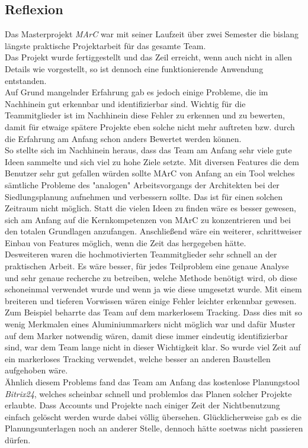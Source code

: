 \subsection{Reflexion}\label{sec:reflexion}
Das Masterprojekt \textit{MArC} war mit seiner Laufzeit über zwei Semester die bislang längste praktische Projektarbeit für das gesamte Team. \\
Das Projekt wurde fertiggestellt und das Zeil erreicht, wenn auch nicht in allen Details wie vorgestellt, so ist dennoch eine funktionierende Anwendung entstanden.\\
Auf Grund mangelnder Erfahrung gab es jedoch einige Probleme, die im Nachhinein gut erkennbar und identifizierbar sind. Wichtig für die Teammitglieder ist im Nachhinein diese Fehler zu erkennen und zu bewerten, damit für etwaige spätere Projekte eben solche nicht mehr auftreten bzw. durch die Erfahrung am Anfang schon anders Bewertet werden können.\\
So stellte sich im Nachhinein heraus, dass das Team am Anfang sehr viele gute Ideen sammelte und sich viel zu hohe Ziele setzte. Mit diversen Features die dem Benutzer sehr gut gefallen würden sollte MArC von Anfang an ein Tool welches sämtliche Probleme des "analogen" Arbeitsvorgangs der Architekten bei der Siedlungsplanung aufnehmen und verbessern sollte. Das ist für einen solchen Zeitraum nicht möglich. Statt die vielen Ideen zu finden wäre es besser gewesen, sich am Anfang auf die Kernkompetenzen von MArC zu konzentrieren und bei den totalen Grundlagen anzufangen. Anschließend wäre ein weiterer, schrittweiser Einbau von Features möglich, wenn die Zeit das hergegeben hätte.\\
Desweiteren waren die hochmotivierten Teammitglieder sehr schnell an der praktischen Arbeit. Es wäre besser, für jedes Teilproblem eine genaue Analyse und sehr genaue recherche zu betreiben, welche Methode benötigt wird, ob diese schoneinmal verwendet wurde und wenn ja wie diese umgesetzt wurde. Mit einem breiteren und tieferen Vorwissen wären einige Fehler leichter erkennbar gewesen. Zum Beispiel beharrte das Team auf dem markerlosem Tracking. Dass dies mit so wenig Merkmalen eines Aluminiummarkers nicht möglich war und dafür Muster auf dem Marker notwendig wären, damit diese immer eindeutig identifizierbar sind, war dem Team lange nicht in dieser Wichtigkeit klar. So wurde viel Zeit auf ein markerloses Tracking verwendet, welche besser an anderen Baustellen aufgehoben wäre. \\
Ähnlich diesem Problems fand das Team am Anfang das kostenlose Planungstool \textit{Bitrix24}, welches scheinbar schnell und problemlos das Planen solcher Projekte erlaubte. Dass Accounts und Projekte nach einiger Zeit der Nichtbenutzung einfach gelöscht werden wurde dabei völlig übersehen. Glücklicherweise gab es die Planungsunterlagen noch an anderer Stelle, dennoch hätte soetwas nicht passieren dürfen.\\
